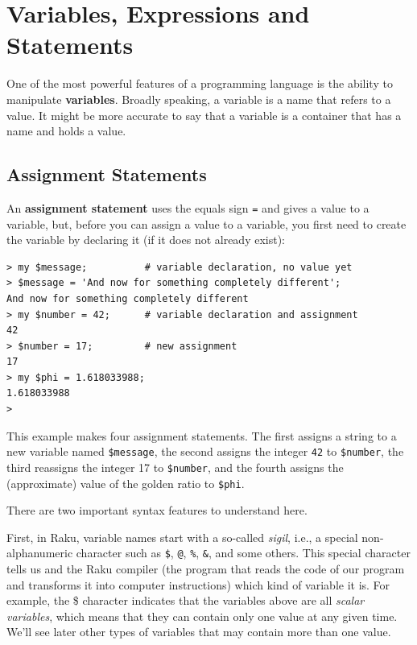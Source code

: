 \chapter{Variables, Expressions and Statements}

One of the most powerful features of a programming language 
is the ability to manipulate {\bf variables}.  Broadly 
speaking, a variable is a name that refers to a value. It 
might be more accurate to say that a variable is a container 
that has a name and holds a value.


\section{Assignment Statements}
\label{variables}

An {\bf assignment statement} uses the equals sign {\tt =} 
and  gives a value to a variable, but, before you can assign 
a value to a variable, you first need to create the 
variable by declaring it (if it does not already 
exist):

\begin{verbatim}
> my $message;          # variable declaration, no value yet
> $message = 'And now for something completely different';
And now for something completely different
> my $number = 42;      # variable declaration and assignment
42
> $number = 17;         # new assignment
17
> my $phi = 1.618033988;
1.618033988
>
\end{verbatim}
%

This example makes four assignment statements.  The first 
assigns a string to a new variable named {\tt \$message}, 
the second assigns the integer {\tt 42} to {\tt \$number}, the 
third reassigns the integer 17 to {\tt \$number}, and the fourth 
assigns the (approximate) value of the golden ratio to {\tt \$phi}.

There are two important syntax features to understand here.

First, in Raku, variable names start with a so-called 
\emph{sigil}, i.e., a special non-alphanumeric character such 
as \verb'$', \verb'@', \verb'%', \verb'&', and some others. 
This special character 
tells us and the Raku compiler (the program that reads 
the code of our program and transforms it into computer 
instructions) which kind of variable it is. For example, the 
\$ character indicates that the variables above are all 
\emph{scalar variables}, which means that they can contain 
only one value at any given time. We'll see later other 
types of variables that may contain more than one value.

